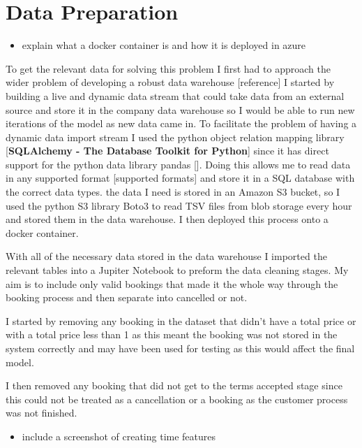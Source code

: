 \section{Data Preparation}

\begin{itemize}
\item explain what a docker container is and how it is deployed in azure 
\end{itemize}


To get the relevant data for solving this problem I first had to approach the wider problem of developing a robust data warehouse [reference] I started by building a live and dynamic data stream that could take data from an external source and store it in the company data warehouse so I would be able to run new iterations of the model as new data came in. To facilitate the problem of having a dynamic data import stream I used the python object relation mapping library [\textbf{SQLAlchemy - The Database Toolkit for Python}] since it has direct support for the python data library pandas []. Doing this allows me to read data in any supported format [supported formats] and store it in a SQL database with the correct data types. the data I need is stored in an Amazon S3 bucket, so I used the python S3 library Boto3 to read TSV files from blob storage every hour and stored them in the data warehouse. I then deployed this process onto a docker container.

\vspace{5mm}

With all of the necessary data stored in the data warehouse I imported the relevant tables into a Jupiter Notebook to preform the data cleaning stages. My aim is to include only valid bookings that made it the whole way through the booking process and then separate into cancelled or not.

I started by removing any booking in the dataset that didn't have a total price or with a total price less than 1 as this meant the booking was not stored in the system correctly and may have been used for testing as this would affect the final model. 

I then removed any booking that did not get to the terms accepted stage since this could not be treated as a cancellation or a booking as the customer process was not finished.

\begin{itemize}
\item include a screenshot of creating time features
\end{itemize}


